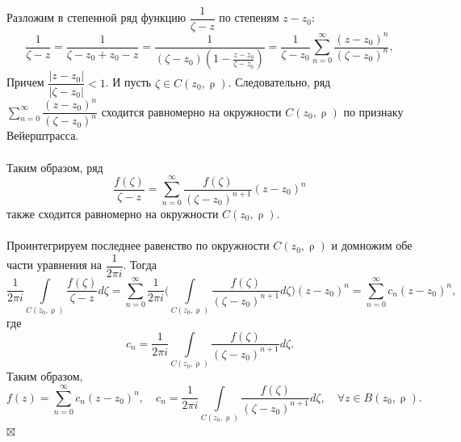 \documentclass[a4paper, 12pt]{article}
\newenvironment{Proof} %
{\par\noindent{$\blacklozenge$}} %
{\hfill$\scriptstyle\boxtimes$}
\renewcommand{\rho}{\uprho}
\newcommand{\sumz}{\sum\limits_{n = 0}^\infty }
\begin{document}
\begin{Proof}
Разложим в степенной ряд функцию $\dfrac{1}{\zeta - z}$ по степеням $z - z_0$:
$$\dfrac{1}{\zeta - z} = \dfrac{1}{\zeta - z_0 + z_0 - z} = \dfrac{1}{(\zeta - z_0)(1 - \frac{z-z_0}{\zeta - z_0})} = \dfrac{1}{\zeta - z_0}\sumz\dfrac{(z-z_0)^n}{(\zeta - z_0)^n},$$
Причем $\dfrac{|z-z_0|}{|\zeta - z_0|} < 1$. И пусть $\zeta \in C(z_0,\rho)$. Следовательно, ряд $\sumz\dfrac{(z-z_0)^n}{(\zeta - z_0)^n}$ сходится равномерно на окружности $C(z_0,\rho)$ по признаку Вейерштрасса.\\\\ Таким образом, ряд $$\dfrac{f(\zeta)}{\zeta - z} = \sumz \dfrac{f(\zeta)}{(\zeta - z_0)^{n+1}}(z-z_0)^n$$ также сходится равномерно на окружности $C(z_0,\rho)$.\\\\
Проинтегрируем последнее равенство по окружности $C(z_0,\rho)$ и домножим обе части уравнения на $\dfrac{1}{2\pi i}$. Тогда $$\dfrac{1}{2\pi i}\int\limits_{C(z_0,\rho)} \dfrac{f(\zeta)}{\zeta - z}d\zeta = \sumz \dfrac{1}{2\pi i} \Big(\int\limits_{C(z_0,\rho)}\dfrac{f(\zeta)}{(\zeta - z_0)^{n+1}}d\zeta \Big)(z-z_0)^n = \sumz c_n(z-z_0)^n,$$
где $$c_n = \dfrac{1}{2\pi i}\int\limits_{C(z_0,\rho)}\dfrac{f(\zeta)}{(\zeta - z_0)^{n+1}}d\zeta.$$
Таким образом, $$f(z) =\sumz c_n(z-z_0)^n,\quad c_n = \dfrac{1}{2\pi i}\int\limits_{C(z_0,\rho)}\dfrac{f(\zeta)}{(\zeta - z_0)^{n+1}}d\zeta,\quad\forall z \in B(z_0, \rho).$$
\end{Proof}
\end{document}
